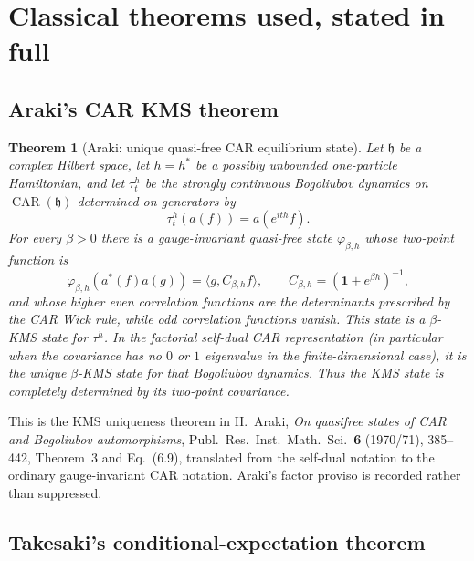\documentclass[11pt]{article}
\newtheorem{theorem}{Theorem}[section]
\theoremstyle{remark}
\newcommand{\id}{\mathbf 1}
\newcommand{\CAR}{\operatorname{CAR}}
\begin{document}
\section{Classical theorems used, stated in full}

\subsection{Araki's CAR KMS theorem}

\begin{theorem}[Araki: unique quasi-free CAR equilibrium state]
\label{thm:araki}
Let $\mathfrak h$ be a complex Hilbert space, let $h=h^*$ be a
possibly unbounded one-particle Hamiltonian, and let
$\tau_t^h$ be the strongly continuous Bogoliubov dynamics on
$\CAR(\mathfrak h)$ determined on generators by
\[
 \tau_t^h(a(f))=a(e^{ith}f).
\]
For every $\beta>0$ there is a gauge-invariant quasi-free state
$\varphi_{\beta,h}$ whose two-point function is
\[
 \varphi_{\beta,h}(a^*(f)a(g))
 =\langle g,C_{\beta,h}f\rangle,\qquad
 C_{\beta,h}=(\id+e^{\beta h})^{-1},
\tag{2.1}\label{eq:araki-cov}
\]
and whose higher even correlation functions are the determinants
prescribed by the CAR Wick rule, while odd correlation functions
vanish.  This state is a $\beta$-KMS state for $\tau^h$.  In the
factorial self-dual CAR representation (in particular when the
covariance has no $0$ or $1$ eigenvalue in the finite-dimensional
case), it is the unique $\beta$-KMS state for that Bogoliubov
dynamics.  Thus the KMS state is completely determined by its
two-point covariance.
\end{theorem}

This is the KMS uniqueness theorem in
H.~Araki, \emph{On quasifree states of CAR and Bogoliubov
automorphisms}, Publ.\ Res.\ Inst.\ Math.\ Sci.\ \textbf{6}
(1970/71), 385--442, Theorem~3 and Eq.~(6.9), translated from the
self-dual notation to the ordinary gauge-invariant CAR notation.
Araki's factor proviso is recorded rather than suppressed.

\subsection{Takesaki's conditional-expectation theorem}
\end{document}
